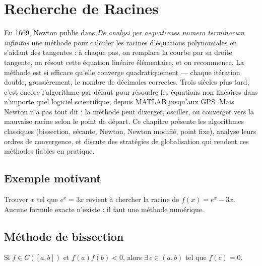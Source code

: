 \chapter{Recherche de Racines}
\label{ch:racines}

En 1669, Newton publie dans \emph{De analysi per aequationes numero terminorum infinitas} une méthode pour calculer les racines d'équations polynomiales en s'aidant des tangentes : à chaque pas, on remplace la courbe par sa droite tangente, on résout cette équation linéaire élémentaire, et on recommence. La méthode est si efficace qu'elle converge quadratiquement --- chaque itération double, grossièrement, le nombre de décimales correctes. Trois siècles plus tard, c'est encore l'algorithme par défaut pour résoudre les équations non linéaires dans n'importe quel logiciel scientifique, depuis MATLAB jusqu'aux GPS. Mais Newton n'a pas tout dit : la méthode peut diverger, osciller, ou converger vers la mauvaise racine selon le point de départ. Ce chapitre présente les algorithmes classiques (bissection, sécante, Newton, Newton modifié, point fixe), analyse leurs ordres de convergence, et discute des stratégies de globalisation qui rendent ces méthodes fiables en pratique.

\section{Exemple motivant}
Trouver $x$ tel que $e^x = 3x$ revient \`a chercher la racine de $f(x)=e^x-3x$. Aucune formule exacte n'existe : il faut une m\'ethode num\'erique.

\section{M\'ethode de bissection}

\begin{theoreme}
Si $f\in C([a,b])$ et $f(a)f(b)<0$, alors $\exists\,c\in(a,b)$ tel que $f(c)=0$.
\end{theoreme}

\begin{algorithm}[H]
\caption{Bissection}\label{alg:bissection}
\end{algorithm}

